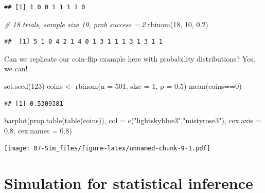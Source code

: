 \documentclass[
]{book}
\newenvironment{Shaded}{\begin{snugshade}}{\end{snugshade}}
\newcommand{\AttributeTok}[1]{\textcolor[rgb]{0.77,0.63,0.00}{#1}}
\newcommand{\CommentTok}[1]{\textcolor[rgb]{0.56,0.35,0.01}{\textit{#1}}}
\newcommand{\DecValTok}[1]{\textcolor[rgb]{0.00,0.00,0.81}{#1}}
\newcommand{\FloatTok}[1]{\textcolor[rgb]{0.00,0.00,0.81}{#1}}
\newcommand{\FunctionTok}[1]{\textcolor[rgb]{0.00,0.00,0.00}{#1}}
\newcommand{\NormalTok}[1]{#1}
\newcommand{\OtherTok}[1]{\textcolor[rgb]{0.56,0.35,0.01}{#1}}
\newcommand{\SpecialCharTok}[1]{\textcolor[rgb]{0.00,0.00,0.00}{#1}}
\newcommand{\StringTok}[1]{\textcolor[rgb]{0.31,0.60,0.02}{#1}}
\theoremstyle{definition}
\theoremstyle{definition}
\theoremstyle{definition}
\theoremstyle{definition}
\theoremstyle{remark}
\begin{document}
\begin{verbatim}
## [1] 1 0 0 1 1 1 1 0
\end{verbatim}

\begin{Shaded}
\begin{Highlighting}[]
\CommentTok{\# 18 trials, sample size 10, prob success =.2}
\FunctionTok{rbinom}\NormalTok{(}\DecValTok{18}\NormalTok{, }\DecValTok{10}\NormalTok{, }\FloatTok{0.2}\NormalTok{)}
\end{Highlighting}
\end{Shaded}

\begin{verbatim}
##  [1] 5 1 0 4 2 1 4 0 1 3 1 1 1 3 1 3 1 1
\end{verbatim}

Can we replicate our coin-flip example here with probability distributions? Yes, we can!

\begin{Shaded}
\begin{Highlighting}[]
\FunctionTok{set.seed}\NormalTok{(}\DecValTok{123}\NormalTok{)}
\NormalTok{coins }\OtherTok{\textless{}{-}} \FunctionTok{rbinom}\NormalTok{(}\AttributeTok{n =} \DecValTok{501}\NormalTok{, }\AttributeTok{size =} \DecValTok{1}\NormalTok{, }\AttributeTok{p =} \FloatTok{0.5}\NormalTok{)}
\FunctionTok{mean}\NormalTok{(coins}\SpecialCharTok{==}\DecValTok{0}\NormalTok{)}
\end{Highlighting}
\end{Shaded}

\begin{verbatim}
## [1] 0.5309381
\end{verbatim}

\begin{Shaded}
\begin{Highlighting}[]
\FunctionTok{barplot}\NormalTok{(}\FunctionTok{prop.table}\NormalTok{(}\FunctionTok{table}\NormalTok{(coins)),}
        \AttributeTok{col =} \FunctionTok{c}\NormalTok{(}\StringTok{"lightskyblue3"}\NormalTok{,}\StringTok{"mistyrose3"}\NormalTok{),}
        \AttributeTok{cex.axis =} \FloatTok{0.8}\NormalTok{, }\AttributeTok{cex.names =} \FloatTok{0.8}\NormalTok{)}
\end{Highlighting}
\end{Shaded}

\texttt{[image: 07-Sim\_files/figure-latex/unnamed-chunk-9-1.pdf]}

\hypertarget{simulation-for-statistical-inference}{%
\section{Simulation for statistical inference}\label{simulation-for-statistical-inference}}
\end{document}
